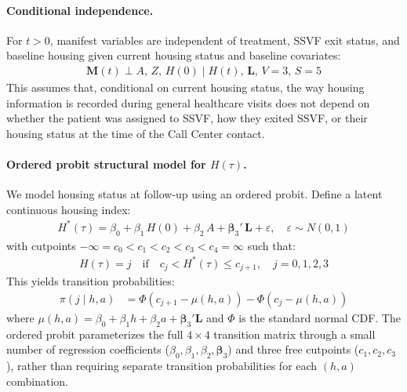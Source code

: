 \paragraph{Conditional independence.} For $t > 0$, manifest variables are independent of treatment, SSVF exit status, and baseline housing given current housing status and baseline covariates:
\begin{align*}
    \boldsymbol{M}(t) \perp A,\, Z,\, H(0) \mid H(t),\, \boldsymbol{L},\, V=3,\, S=5
\end{align*}
This assumes that, conditional on current housing status, the way housing information is recorded during general healthcare visits does not depend on whether the patient was assigned to SSVF, how they exited SSVF, or their housing status at the time of the Call Center contact.

\paragraph{Ordered probit structural model for $H(\tau)$.} We model housing status at follow-up using an ordered probit. Define a latent continuous housing index:
\begin{align*}
    H^*(\tau) = \beta_0 + \beta_1\, H(0) + \beta_2\, A + \boldsymbol{\beta}_3'\, \boldsymbol{L} + \varepsilon, \quad \varepsilon \sim N(0, 1)
\end{align*}
with cutpoints $-\infty = c_0 < c_1 < c_2 < c_3 < c_4 = \infty$ such that:
\begin{align*}
    H(\tau) = j \quad \text{if} \quad c_j < H^*(\tau) \leq c_{j+1}, \quad j = 0, 1, 2, 3
\end{align*}
This yields transition probabilities:
\begin{align*}
    \pi(j \mid h, a) &= \Phi(c_{j+1} - \mu(h, a)) - \Phi(c_j - \mu(h, a))
\end{align*}
where $\mu(h, a) = \beta_0 + \beta_1 h + \beta_2 a + \boldsymbol{\beta}_3' \boldsymbol{L}$ and $\Phi$ is the standard normal CDF. The ordered probit parameterizes the full $4 \times 4$ transition matrix through a small number of regression coefficients ($\beta_0, \beta_1, \beta_2, \boldsymbol{\beta}_3$) and three free cutpoints ($c_1, c_2, c_3$), rather than requiring separate transition probabilities for each $(h, a)$ combination.

